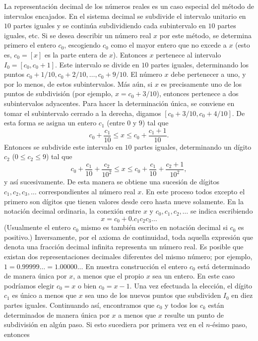 \documentclass[12pt]{book}
\theoremstyle{definition}
\begin{document}
La representación decimal de los números reales es un caso especial del método de intervalos encajados. En el sistema decimal se subdivide el intervalo unitario en $10$ partes iguales y se continúa subdividiendo cada subintervalo en $10$ partes iguales, etc. Si se desea describir un número real $x$ por este método, se determina primero el entero $c_0$, escogiendo $c_0$ como el mayor entero que no excede a $x$ (esto es, $c_0 = [x]$ es la parte entera de $x$). Entonces $x$ pertenece al intervalo $I_0 = [c_0, c_0 + 1]$. Este intervalo se divide en $10$ partes iguales, determinando los puntos $c_0 + 1/10, c_0 + 2/10, \dots, c_0 + 9/10$. El número $x$ debe pertenecer a uno, y por lo menos, de estos subintervalos. Más aún, si $x$ es precisamente uno de los puntos de subdivisión (por ejemplo, $x = c_0 + 3/10$), entonces pertenece a dos subintervalos adyacentes. Para hacer la determinación única, se conviene en tomar el subintervalo cerrado a la derecha, digamos $[c_0 + 3/10, c_0 + 4/10]$. De esta forma se asigna un entero $c_1$ (entre $0$ y $9$) tal que
\[
c_0 + \frac{c_1}{10} \le x \le c_0 + \frac{c_1+1}{10}.
\]
Entonces se subdivide este intervalo en $10$ partes iguales, determinando un dígito $c_2$ ($0 \le c_2 \le 9$) tal que
\[
c_0 + \frac{c_1}{10} + \frac{c_2}{10^2} \le x \le c_0 + \frac{c_1}{10} + \frac{c_2+1}{10^2},
\]
y así sucesivamente. De esta manera se obtiene una sucesión de dígitos $c_1, c_2, c_3, \dots$ correspondientes al número real $x$. En este proceso todos excepto el primero son dígitos que tienen valores desde cero hasta nueve solamente. En la notación decimal ordinaria, la conexión entre $x$ y $c_0, c_1, c_2, \dots$ se indica escribiendo
\[
x = c_0 + 0.c_1c_2c_3\ldots
\]
(Usualmente el entero $c_0$ mismo es también escrito en notación decimal si $c_0$ es positivo.) Inversamente, por el axioma de continuidad, toda aquella expresión que denota una fracción decimal infinita representa un número real. Es posible que existan dos representaciones decimales diferentes del mismo número; por ejemplo, $1 = 0.99999\ldots = 1.00000\ldots$ En nuestra construcción el entero $c_0$ está determinado de manera única por $x$, a menos que el propio $x$ sea un entero. En este caso podríamos elegir $c_0 = x$ o bien $c_0 = x-1$. Una vez efectuada la elección, el dígito $c_1$ es único a menos que $x$ sea uno de los nuevos puntos que subdividen $I_0$ en diez partes iguales. Continuando así, encontramos que $c_0$ y todos los $c_k$ están determinados de manera única por $x$ a menos que $x$ resulte un punto de subdivisión en algún paso. Si esto sucediera por primera vez en el $n$-ésimo paso, entonces
\end{document}
